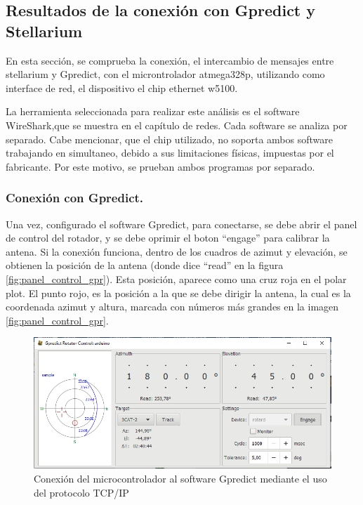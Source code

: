 \subsection{Resultados de la conexión con Gpredict y Stellarium} 

En esta sección, se comprueba la conexión, el intercambio de mensajes entre stellarium y Gpredict, con el microntrolador atmega328p, utilizando como interface de red, el dispositivo el chip ethernet w5100. 

La herramienta seleccionada para realizar este análisis es el software WireShark,que se muestra en el capítulo de redes. Cada software se analiza por separado. Cabe mencionar, que el chip utilizado, no soporta ambos software trabajando en simultaneo, debido a sus limitaciones físicas, impuestas por el fabricante. Por este motivo, se prueban ambos programas por separado. 

\subsubsection{Conexión con Gpredict.} 

Una vez, configurado el software Gpredict, para conectarse, se debe abrir el panel de control del rotador, y se debe oprimir el boton ``engage'' para calibrar la antena. Si la conexión funciona, dentro de los cuadros de azimut y elevación, se obtienen la posición de la antena (donde dice ``read'' en la figura \ref{fig:panel_control_gpr}). Esta posición, aparece como una cruz roja en el polar plot. El punto rojo, es la posición a la que se debe dirigir la antena, la cual es la coordenada azimut y altura, marcada con números más grandes en la imagen \ref{fig:panel_control_gpr}. 


\begin{figure}[ht]
	\includegraphics[scale=0.7]{gpred_rotador} 
	\caption{Conexión del microcontrolador al software Gpredict mediante el uso del protocolo TCP/IP} 
	\label{fig:prueba_gpredict_1} 
\end{figure}

